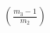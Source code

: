 \documentclass[preview]{standalone}
\begin{document}
\begin{align*}
\left(\frac{m_3 - 1}{m_2}\right)
\end{align*}
\end{document}
